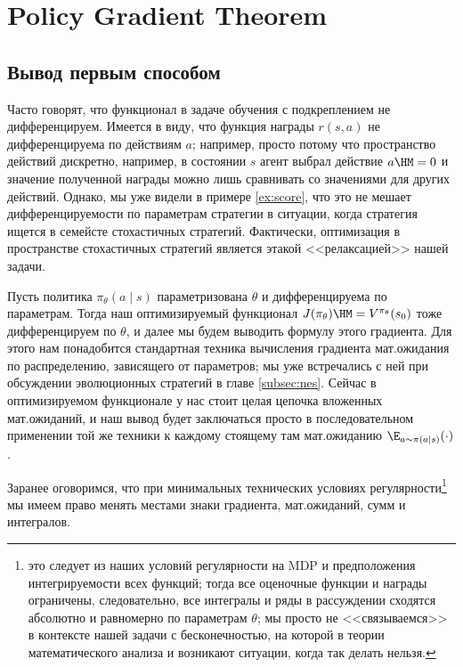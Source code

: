 \section{Policy Gradient Theorem}\label{PGTsection}

\subsection{Вывод первым способом}

Часто говорят, что функционал в задаче обучения с подкреплением не дифференцируем. Имеется в виду, что функция награды $r(s, a)$ не дифференцируема по действиям $a$; например, просто потому что пространство действий дискретно, например, в состоянии $s$ агент выбрал действие $a \HM = 0$ и значение полученной награды можно лишь сравнивать со значениями для других действий. Однако, мы уже видели в примере \ref{ex:score}, что это не мешает дифференцируемости по параметрам стратегии в ситуации, когда стратегия ищется в семейсте стохастичных стратегий. Фактически, оптимизация в пространстве стохастичных стратегий является этакой <<релаксацией>> нашей задачи.

Пусть политика $\pi_{\theta}(a \mid s)$ параметризована $\theta$ и дифференцируема по параметрам. Тогда наш оптимизируемый функционал $J(\pi_\theta) \HM= V^{\pi_\theta}(s_0)$ тоже дифференцируем по $\theta$, и далее мы будем выводить формулу этого градиента. Для этого нам понадобится стандартная техника вычисления градиента мат.ожидания по распределению, зависящего от параметров; мы уже встречались с ней при обсуждении эволюционных стратегий в главе \ref{subsec:nes}. Сейчас в оптимизируемом функционале у нас стоит целая цепочка вложенных мат.ожиданий, и наш вывод будет заключаться просто в последовательном применении той же техники к каждому стоящему там мат.ожиданию $\E_{a \sim \pi(a \mid s)} ( \cdot )$.

Заранее оговоримся, что при минимальных технических условиях регулярности\footnote{это следует из наших условий регулярности на MDP и предположения интегрируемости всех функций; тогда все оценочные функции и награды ограничены, следовательно, все интегралы и ряды в рассуждении сходятся абсолютно и равномерно по параметрам $\theta$; мы просто не <<связываемся>> в контексте нашей задачи с бесконечностью, на которой в теории математического анализа и возникают ситуации, когда так делать нельзя.} мы имеем право менять местами знаки градиента, мат.ожиданий, сумм и интегралов.

